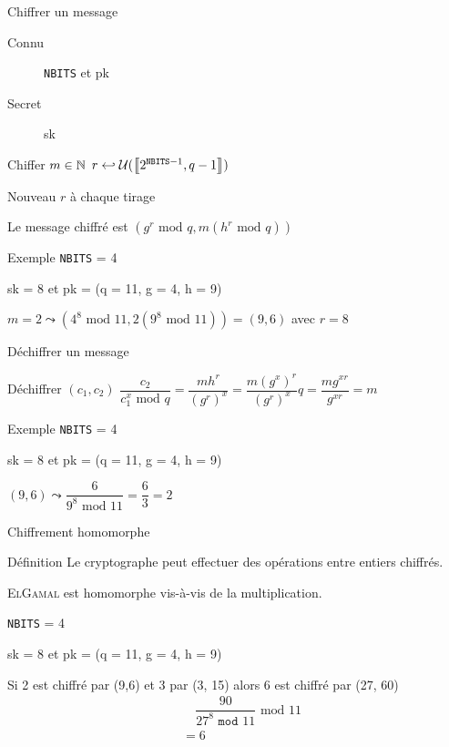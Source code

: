 \documentclass[10pt, compress]{beamer}
\begin{document}
  \begin{frame}{Chiffrer un message}
    \begin{description}
      \item[Connu] \texttt{NBITS} et pk
      \item[Secret]  sk
    \end{description}
    \begin{alertblock}{Chiffer $m\in\mathbb{N}$}
      \(r\hookleftarrow\mathcal{U}(\left\llbracket2^{\texttt{NBITS}-1}, q-1\right\rrbracket)\)

      Nouveau $r$ à chaque tirage

      Le message chiffré est \((g^r\text{ mod }q, m(h^r\text{ mod }q))\)
    \end{alertblock}
    \begin{exampleblock}{Exemple}
      \texttt{NBITS} = 4

      sk = 8 et pk = (q = 11, g = 4, h = 9)
      
      $m=2\leadsto (4^8\text{ mod }11, 2(9^8\text{ mod }11)) = (9, 6)$ avec $r=8$
    \end{exampleblock}
  \end{frame}

  \begin{frame}{Déchiffrer un message}
    \begin{alertblock}{Déchiffrer $(c_1, c_2)$}
      \(\dfrac{c_2}{c_1^x\text{ mod }q} = \dfrac{m h^r}{(g^r)^x} = \dfrac{m (g^x)^r}{(g^r)^x}q = \dfrac{m g^{xr}}{g^{xr}} = m\)
    \end{alertblock}
    \begin{exampleblock}{Exemple}
      \texttt{NBITS} = 4

      sk = 8 et pk = (q = 11, g = 4, h = 9)
      
      $(9, 6)\leadsto \dfrac{6}{9^8\text{ mod }11} = \dfrac{6}{3} = 2$
    \end{exampleblock}
  \end{frame}

  \begin{frame}{Chiffrement homomorphe}
    \begin{exampleblock}{Définition}
      Le cryptographe peut effectuer des opérations entre entiers chiffrés.

      \textsc{ElGamal} est homomorphe vis-à-vis de la multiplication.
    \end{exampleblock}
    \bigbreak
    \texttt{NBITS} = 4

    sk = 8 et pk = (q = 11, g = 4, h = 9)

    Si 2 est chiffré par (9,6) et 3 par (3, 15) alors 6 est chiffré par (27, 60)
    \begin{align*}
      &\quad\dfrac{90}{27^8\texttt{ mod }11}\text{ mod } 11\\
      &= 6
    \end{align*}
  \end{frame}
\end{document}
